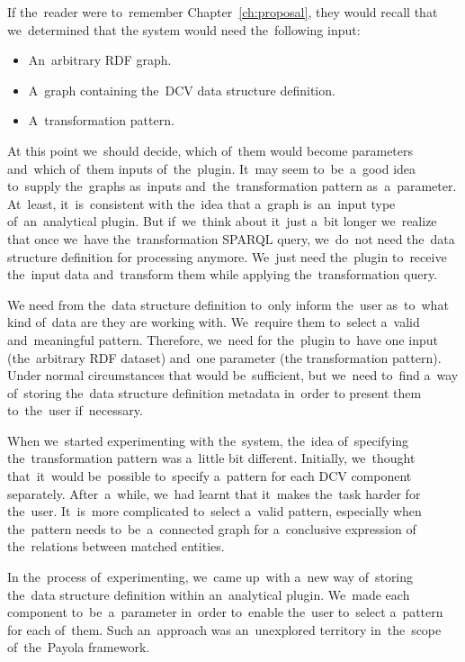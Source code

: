 If the~reader were to~remember Chapter~\ref{ch:proposal}, they would recall that we~determined that 
the system would need the~following input:
\begin{itemize}
  \item An~arbitrary RDF graph.
  \item A~graph containing the~DCV data structure definition.
  \item A~transformation pattern.
\end{itemize}

At this point we~should decide, which of~them would become parameters and~which of~them inputs of~the~plugin. It~may seem to~be~a~good idea to~supply the~graphs as~inputs and~the~transformation pattern as~a~parameter. At~least, it~is~consistent with the~idea that a~graph is~an~input type of~an~analytical plugin. 
But if~we~think about it~just a~bit longer we~realize that once we~have the~transformation SPARQL query, we~do~not need the~data structure definition for 
processing anymore. We~just need the~plugin to~receive the~input data and~transform 
them while applying the~transformation query.

We need from the~data structure definition to~only inform the~user as~to~what kind of~data are they 
are working 
with. We~require them to~select a~valid and~meaningful pattern. 
Therefore, we~need for the~plugin to~have one input (the~arbitrary RDF dataset) and~one parameter (the transformation pattern). Under normal circumstances
that would be~sufficient, but we~need to~find a~way of~storing the~data structure definition metadata in~order 
to present them to~the~user if~necessary.

\begin{sloppypar}
When we~started experimenting with the~system, the~idea of~specifying the~transformation pattern was a~little bit different. Initially, we~thought that~it~would be~possible to~specify a~pattern for each DCV component separately. After~a~while, we~had learnt that it~makes the~task harder for the~user. It~is~more complicated to~select a~valid pattern, especially when the~pattern needs to~be~a~connected graph for a~conclusive expression
of the~relations between matched entities.
\end{sloppypar}

In the~process of~experimenting, we~came up~with a~new way of~storing the~data structure definition within an~analytical plugin. We~made each component to~be~a~parameter in~order to~enable the~user to~select a~pattern for each of~them. Such an~approach was an~unexplored territory in~the~scope of~the~Payola framework.

